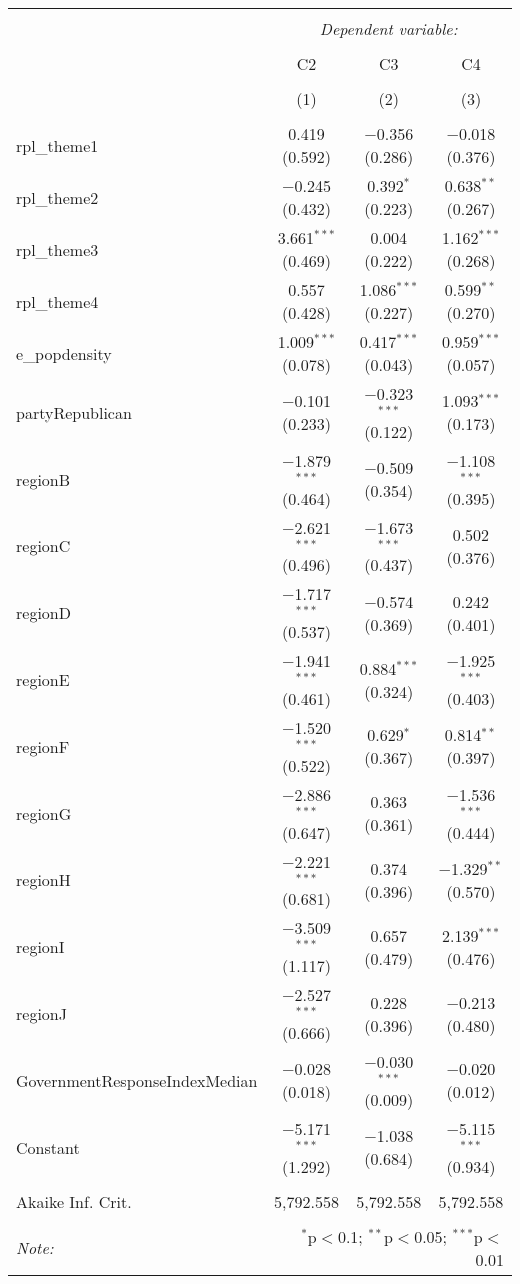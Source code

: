 
\begin{table}[!htbp] \centering 
  \caption{} 
  \label{} 
\begin{tabular}{@{\extracolsep{5pt}}lccc} 
\\[-1.8ex]\hline 
\hline \\[-1.8ex] 
 & \multicolumn{3}{c}{\textit{Dependent variable:}} \\ 
\cline{2-4} 
\\[-1.8ex] & C2 & C3 & C4 \\ 
\\[-1.8ex] & (1) & (2) & (3)\\ 
\hline \\[-1.8ex] 
 rpl\_theme1 & 0.419 (0.592) & $-$0.356 (0.286) & $-$0.018 (0.376) \\ 
  rpl\_theme2 & $-$0.245 (0.432) & 0.392$^{*}$ (0.223) & 0.638$^{**}$ (0.267) \\ 
  rpl\_theme3 & 3.661$^{***}$ (0.469) & 0.004 (0.222) & 1.162$^{***}$ (0.268) \\ 
  rpl\_theme4 & 0.557 (0.428) & 1.086$^{***}$ (0.227) & 0.599$^{**}$ (0.270) \\ 
  e\_popdensity & 1.009$^{***}$ (0.078) & 0.417$^{***}$ (0.043) & 0.959$^{***}$ (0.057) \\ 
  partyRepublican & $-$0.101 (0.233) & $-$0.323$^{***}$ (0.122) & 1.093$^{***}$ (0.173) \\ 
  regionB & $-$1.879$^{***}$ (0.464) & $-$0.509 (0.354) & $-$1.108$^{***}$ (0.395) \\ 
  regionC & $-$2.621$^{***}$ (0.496) & $-$1.673$^{***}$ (0.437) & 0.502 (0.376) \\ 
  regionD & $-$1.717$^{***}$ (0.537) & $-$0.574 (0.369) & 0.242 (0.401) \\ 
  regionE & $-$1.941$^{***}$ (0.461) & 0.884$^{***}$ (0.324) & $-$1.925$^{***}$ (0.403) \\ 
  regionF & $-$1.520$^{***}$ (0.522) & 0.629$^{*}$ (0.367) & 0.814$^{**}$ (0.397) \\ 
  regionG & $-$2.886$^{***}$ (0.647) & 0.363 (0.361) & $-$1.536$^{***}$ (0.444) \\ 
  regionH & $-$2.221$^{***}$ (0.681) & 0.374 (0.396) & $-$1.329$^{**}$ (0.570) \\ 
  regionI & $-$3.509$^{***}$ (1.117) & 0.657 (0.479) & 2.139$^{***}$ (0.476) \\ 
  regionJ & $-$2.527$^{***}$ (0.666) & 0.228 (0.396) & $-$0.213 (0.480) \\ 
  GovernmentResponseIndexMedian & $-$0.028 (0.018) & $-$0.030$^{***}$ (0.009) & $-$0.020 (0.012) \\ 
  Constant & $-$5.171$^{***}$ (1.292) & $-$1.038 (0.684) & $-$5.115$^{***}$ (0.934) \\ 
 \hline \\[-1.8ex] 
Akaike Inf. Crit. & 5,792.558 & 5,792.558 & 5,792.558 \\ 
\hline 
\hline \\[-1.8ex] 
\textit{Note:}  & \multicolumn{3}{r}{$^{*}$p$<$0.1; $^{**}$p$<$0.05; $^{***}$p$<$0.01} \\ 
\end{tabular} 
\end{table} 
